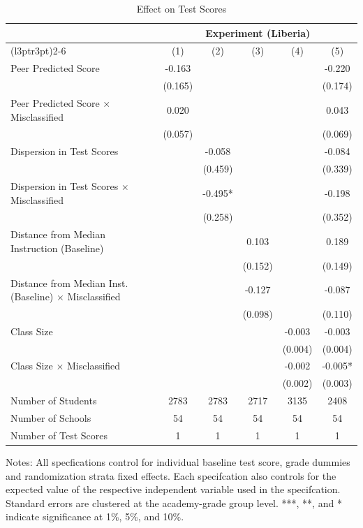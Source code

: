 \begin{table}[!h]
\centering\centering\centering
\caption{Effect on Test Scores}
\centering
\begin{threeparttable}
\fontsize{10}{12}\selectfont
\begin{tabular}[t]{lccccc}
\toprule
\multicolumn{1}{c}{ } & \multicolumn{5}{c}{Experiment (Liberia)} \\
\cmidrule(l{3pt}r{3pt}){2-6}
  & (1) & (2) & (3) & (4) & (5)\\
\midrule
Peer Predicted Score & -0.163 &  &  &  & -0.220\\
 & (0.165) &  &  &  & (0.174)\\
Peer Predicted Score $\times$ Misclassified & 0.020 &  &  &  & 0.043\\
 & (0.057) &  &  &  & (0.069)\\
Dispersion in Test Scores &  & -0.058 &  &  & -0.084\\
 &  & (0.459) &  &  & (0.339)\\
Dispersion in Test Scores $\times$ Misclassified &  & -0.495* &  &  & -0.198\\
 &  & (0.258) &  &  & (0.352)\\
Distance from Median Instruction (Baseline) &  &  & 0.103 &  & 0.189\\
 &  &  & (0.152) &  & (0.149)\\
Distance from Median Inst. (Baseline) $\times$
                                          Misclassified &  &  & -0.127 &  & -0.087\\
 &  &  & (0.098) &  & (0.110)\\
Class Size &  &  &  & -0.003 & -0.003\\
 &  &  &  & (0.004) & (0.004)\\
Class Size $\times$ Misclassified &  &  &  & -0.002 & -0.005*\\
 &  &  &  & (0.002) & (0.003)\\
\hline
\midrule
Number of Students & 2783 & 2783 & 2717 & 3135 & 2408\\
Number of Schools & 54 & 54 & 54 & 54 & 54\\
Number of Test Scores & 1 & 1 & 1 & 1 & 1\\
\bottomrule
\end{tabular}
\begin{tablenotes}[para]
\item Notes: All specfications control for individual baseline test score, grade dummies and randomization                      strata fixed effects. Each specifcation also controls for the expected value of the respective
                    independent variable used in the specifcation. Standard errors are clustered at the academy-grade group
                    level. ***, **, and * indicate significance at 1\%, 5\%, and 10\%.
\end{tablenotes}
\end{threeparttable}
\end{table}
